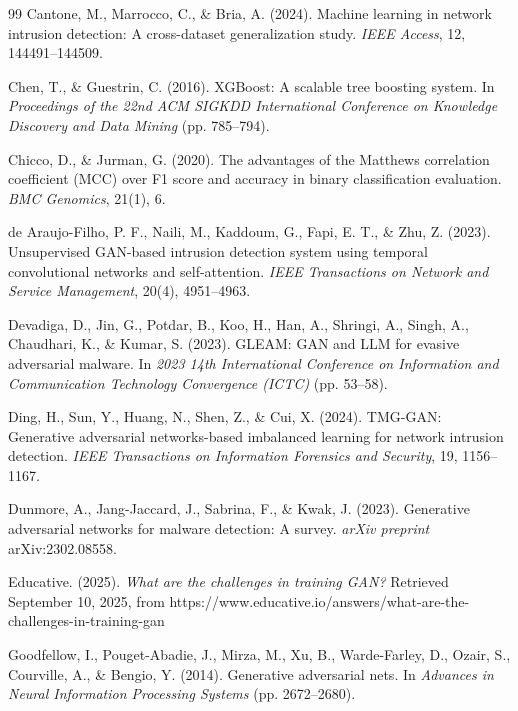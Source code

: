\documentclass[11pt, a4paper]{article}
\begin{document}
\begin{thebibliography}{99}
Cantone, M., Marrocco, C., \& Bria, A. (2024). Machine learning in network intrusion detection: A cross-dataset generalization study. \textit{IEEE Access}, 12, 144491--144509.

Chen, T., \& Guestrin, C. (2016). XGBoost: A scalable tree boosting system. In \textit{Proceedings of the 22nd ACM SIGKDD International Conference on Knowledge Discovery and Data Mining} (pp. 785--794).

Chicco, D., \& Jurman, G. (2020). The advantages of the Matthews correlation coefficient (MCC) over F1 score and accuracy in binary classification evaluation. \textit{BMC Genomics}, 21(1), 6.

de Araujo-Filho, P. F., Naili, M., Kaddoum, G., Fapi, E. T., \& Zhu, Z. (2023). Unsupervised GAN-based intrusion detection system using temporal convolutional networks and self-attention. \textit{IEEE Transactions on Network and Service Management}, 20(4), 4951--4963.

Devadiga, D., Jin, G., Potdar, B., Koo, H., Han, A., Shringi, A., Singh, A., Chaudhari, K., \& Kumar, S. (2023). GLEAM: GAN and LLM for evasive adversarial malware. In \textit{2023 14th International Conference on Information and Communication Technology Convergence (ICTC)} (pp. 53--58).

Ding, H., Sun, Y., Huang, N., Shen, Z., \& Cui, X. (2024). TMG-GAN: Generative adversarial networks-based imbalanced learning for network intrusion detection. \textit{IEEE Transactions on Information Forensics and Security}, 19, 1156--1167.

Dunmore, A., Jang-Jaccard, J., Sabrina, F., \& Kwak, J. (2023). Generative adversarial networks for malware detection: A survey. \textit{arXiv preprint} arXiv:2302.08558.

Educative. (2025). \textit{What are the challenges in training GAN?} Retrieved September 10, 2025, from https://www.educative.io/answers/what-are-the-challenges-in-training-gan

Goodfellow, I., Pouget-Abadie, J., Mirza, M., Xu, B., Warde-Farley, D., Ozair, S., Courville, A., \& Bengio, Y. (2014). Generative adversarial nets. In \textit{Advances in Neural Information Processing Systems} (pp. 2672--2680).


\end{thebibliography}
\end{document}
